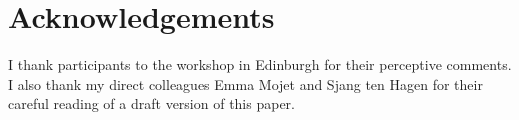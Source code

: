 \documentclass[output=paper]{langscibook}
\begin{document}
\section*{Acknowledgements}

I thank participants to the workshop in Edinburgh for their perceptive comments. I also thank my direct colleagues Emma Mojet and Sjang ten Hagen for their careful reading of a draft version of this paper.

\sloppy
\printbibliography[heading=subbibliography,notkeyword=this] 
\end{document}
